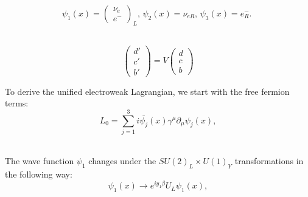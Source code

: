 \begin{equation}\label{eq:psi_for_leptons}
\psi_1(x)=\begin{pmatrix} \nu_e \\ e^- \end{pmatrix}_L \text{, } \psi_2(x)=\nu_{eR} \text{, } \psi_3(x)=e^-_R \text{. }
\end{equation}

\\

\begin{equation}
  \begin{pmatrix} d' \\ c' \\ b' \end{pmatrix} = V
  \begin{pmatrix} d \\ c \\ b \end{pmatrix}
\end{equation}

To derive the unified electroweak Lagrangian, we start with the free fermion terms:\\

\begin{equation}\label{eq:L_free}
L_0 = \sum_{j=1}^{3} i \bar{\psi_j}(x) \gamma^\mu \partial_\mu \psi_j(x), 
\end{equation}

\\

The wave function $\psi_1$ changes under the $SU(2)_L \times U(1)_Y$ transformations in the following way:\\

\begin{equation}\label{eq:psi1_transform}
\psi_1(x) \rightarrow e^{i y_1 \beta} U_L \psi_1(x),
\end{equation}

\\

